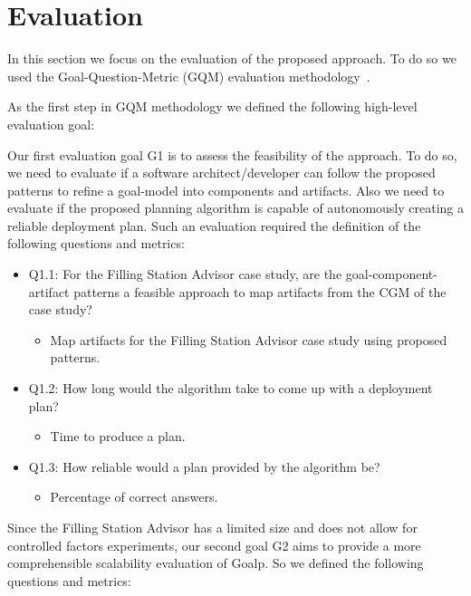 \section{Evaluation}
\label{sec:evaluation}

In this section we focus on the evaluation of the proposed approach.
To do so we used the Goal-Question-Metric (GQM) evaluation methodology~\cite{basili_goal_1994}.

As the first step in GQM methodology we defined the following high-level evaluation goal:

Our first evaluation goal G1 is to assess the feasibility of the approach. To do so, we need to evaluate if a software architect/developer can follow the proposed patterns to refine a goal-model into components and artifacts. Also we need to evaluate if the proposed planning algorithm is capable of autonomously creating a reliable deployment plan.
Such an evaluation required the definition of the following questions and metrics:

\begin{itemize}
  \item Q1.1: For the Filling Station Advisor case study, are the goal-component-artifact patterns a feasible approach to map artifacts from the CGM of the case study?
  \begin{itemize}
    \item Map artifacts for the Filling Station Advisor case study using proposed patterns.
  \end{itemize}

  \item Q1.2: How long would the algorithm take to come up with a deployment plan?
  \begin{itemize}
    \item Time to produce a plan.
  \end{itemize}

  \item Q1.3: How reliable would a plan provided
  by the algorithm be?
  \begin{itemize}
    \item Percentage of correct answers.
  \end{itemize}

\end{itemize}

Since the Filling Station Advisor has a limited size and does not allow for controlled factors experiments, our second goal G2 aims to provide a more comprehensible scalability evaluation of Goalp. So we defined the following questions and metrics:

